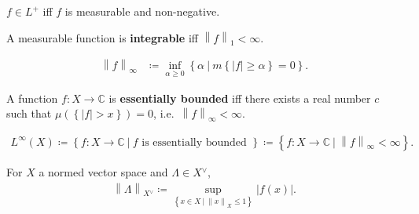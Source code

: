 \begin{definition}

\(f\in L^+\) iff \(f\) is measurable and non-negative.

\end{definition}

\begin{definition}[Integrability]

A measurable function is \textbf{integrable} iff
\({\left\lVert {f} \right\rVert}_1 < \infty\).

\end{definition}

\begin{definition}

\begin{align*}
{\left\lVert {f} \right\rVert}_\infty &\coloneqq\inf_{\alpha \geq 0} \left\{{\alpha {~\mathrel{\Big|}~}m\left\{{{\left\lvert {f} \right\rvert} \geq \alpha}\right\} = 0}\right\}
.\end{align*}

\end{definition}

\begin{definition}

A function \(f:X \to {\mathbb{C}}\) is \textbf{essentially bounded} iff
there exists a real number \(c\) such that
\(\mu(\left\{{{\left\lvert {f} \right\rvert} > x}\right\}) = 0\),
i.e.~\({\left\lVert {f} \right\rVert}_\infty < \infty\).

\end{definition}

\begin{definition}[$L^\infty$]

\begin{align*}
L^\infty(X)
\coloneqq\left\{{f: X\to {\mathbb{C}}{~\mathrel{\Big|}~}f \text{ is essentially bounded }}\right\}
\coloneqq\left\{{f: X\to {\mathbb{C}}{~\mathrel{\Big|}~}{\left\lVert {f} \right\rVert}_{\infty }< \infty}\right\}
.\end{align*}

\end{definition}

\begin{definition}

For \(X\) a normed vector space and \(\Lambda \in X {}^{ \vee }\),
\begin{align*}
{\left\lVert {\Lambda} \right\rVert}_{X {}^{ \vee }} \coloneqq\sup_{\left\{{x\in X {~\mathrel{\Big|}~}{\left\lVert {x} \right\rVert}_X \leq 1}\right\}} {\left\lvert {f(x)} \right\rvert}
.\end{align*}

\end{definition}

